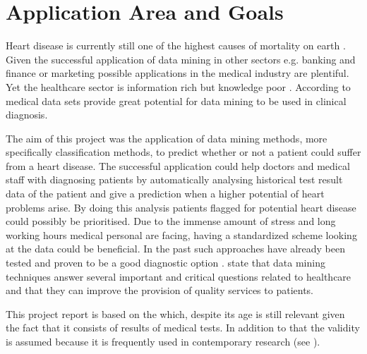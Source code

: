 \section{Application Area and Goals}

Heart disease is currently still one of the highest causes of mortality on earth \citep{nahar2013, kavitha2016, statistischesbundesamt2020}.
Given the successful application of data mining in other sectors e.g. banking and finance or marketing \citep{keles2017} possible applications in the medical industry are plentiful. Yet the healthcare sector is information rich but knowledge poor \citep{soni2011}. According to \citet{soni2011} medical data sets provide great potential for data mining to be used in clinical diagnosis.


The aim of this project was the application of data mining methods, more specifically classification methods, to predict whether or not a patient could suffer from a heart disease. The successful application could help doctors and medical staff with diagnosing patients by automatically analysing historical test result data of the patient and give a prediction when a higher potential of heart problems arise. By doing this analysis patients flagged for potential heart disease could possibly be prioritised. Due to the immense amount of stress and long working hours medical personal are facing, having a standardized scheme looking at the data could be beneficial. 
In the past such approaches have already been tested and proven to be a good diagnostic option \citep{usharani2011}. \citet{jabbar2013} state that data mining techniques answer several important and critical questions related to healthcare and that they can improve the provision of quality services to patients.

This project report is based on the  \citep{janosi1988} which, despite its age is still relevant given the fact that it consists of results of medical tests. In addition to that the validity is assumed because it is frequently used in contemporary research (see \cite{usharani2011, aha1988, nahar2013}).
